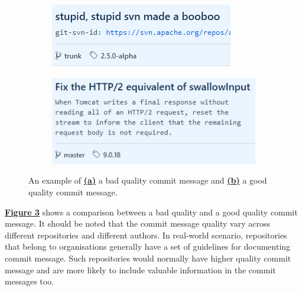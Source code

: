 \documentclass[12pt, a4paper]{report}
\begin{document}
\begin{figure}[H]
  \centering
  \begin{subfigure}{.5\textwidth}
    \centering
    \includegraphics[width=.85\linewidth]{images/bad_commit_msg.png}
    \label{figure:bad_commit_msg}
  \end{subfigure}%
  \begin{subfigure}{.5\textwidth}
    \centering
    \includegraphics[width=.95\linewidth]{images/good_commit_msg.png}
    \label{figure:good_commit_msg}
  \end{subfigure}
  \caption[A comparison between a bad quality and a good quality commit message.]%
  {An example of \hyperref[figure:bad_commit_msg]{\textbf{(a)}} a bad quality commit message and
  \hyperref[figure:good_commit_msg]{\textbf{(b)}} a good quality commit message.}
  \label{figure:quality_commit_msg}
\end{figure}

\hyperref[figure:quality_commit_msg]{\textbf{Figure \ref*{figure:quality_commit_msg}}} shows a
comparison between a bad quality and a good quality commit message. It should be noted that the
commit message quality vary across different repositories and different authors. In real-world
scenario, repositories that belong to organisations generally have a set of guidelines for
documenting commit message. Such repositories would normally have higher quality commit message and
are more likely to include valuable information in the commit messages too.
\end{document}
